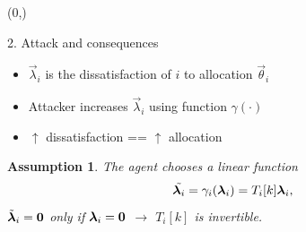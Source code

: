 \documentclass[presentation]{beamer}
\newtheorem{assumption}{Assumption}%
\begin{document}
\begin{frame}
\begin{textblock}{5.1}(0,\secrow)
  \begin{block}{2. Attack and consequences}
    \begin{center}
      \begin{minipage}[c]{.95\textwidth}
        \begin{itemize}
          \item $\vec{\lambda}_{i}$ is the dissatisfaction of $i$ to allocation $\vec{\theta}_{i}$
          \item Attacker increases $\vec{\lambda}_{i}$ using function $\gamma(\cdot)$
          \item $\uparrow$ dissatisfaction == $\uparrow$ allocation
        \end{itemize}
        \begin{assumption}\label{ass:linear_cheating}
          The agent chooses a linear function
          \begin{equation}\label{eq:cheating}
            \tilde{\lambdai}=\gamma_{i}(\vec{\lambda}_{i})=\Tik\vec{\lambda}_{i},
          \end{equation}
          $\tilde{\boldsymbol{\lambda}}_{i}=\mathbf{0}$ only if $\boldsymbol{\lambda}_{i}=\mathbf{0}$ $\rightarrow$ $T_{i}[k]$ is invertible.
        \end{assumption}
        \\~\\
        \centering
\end{minipage}
\end{center}
\end{block}
\end{textblock}
\end{frame}
\end{document}
